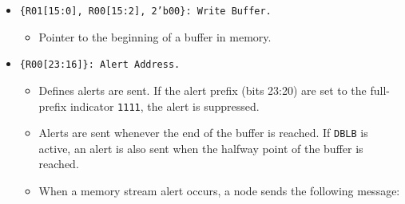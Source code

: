 \begin{itemize}
  \item {\tt \{R01[15:0], R00[15:2], 2'b00\}: Write Buffer.}
    \begin{itemize}
      \item Pointer to the beginning of a buffer in memory.
    \end{itemize}
  \item {\tt \{R00[23:16]\}: Alert Address.}
    \begin{itemize}
      \item Defines alerts are sent. If the alert prefix (bits 23:20) are set
        to the full-prefix indicator {\tt 1111}, the alert is suppressed.
      \item Alerts are sent whenever the end of the buffer is reached.  If
        {\tt DBLB} is active, an alert is also sent when the halfway point of
        the buffer is reached.
      \item When a memory stream alert occurs, a node sends the following
        message:


\end{itemize}
\end{itemize}
